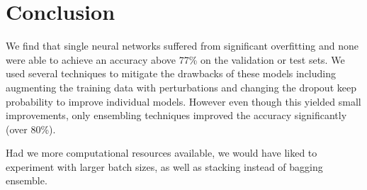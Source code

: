 \section{Conclusion}

We find that single neural networks suffered from significant overfitting and none were able to achieve an accuracy above 77\% on the validation or test sets. We used several techniques to mitigate the drawbacks of these models including augmenting the training data with perturbations and changing the dropout keep probability to improve individual models. However even though this yielded small improvements, only ensembling techniques improved the accuracy significantly (over 80\%).

Had we more computational resources available, we would have liked to experiment with larger batch sizes, as well as stacking instead of bagging ensemble.